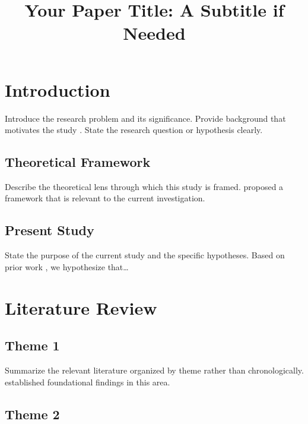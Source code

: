 \documentclass[man]{apa7}
\title{Your Paper Title: A Subtitle if Needed}
\begin{document}
\maketitle

\section{Introduction}

Introduce the research problem and its significance. Provide
background that motivates the study \parencite{smith2023}. State
the research question or hypothesis clearly.

\subsection{Theoretical Framework}

Describe the theoretical lens through which this study is framed.
\textcite{jones2022} proposed a framework that is relevant to the
current investigation.

\subsection{Present Study}

State the purpose of the current study and the specific hypotheses.
Based on prior work \parencite{smith2023,jones2022}, we hypothesize
that\ldots

\section{Literature Review}

\subsection{Theme 1}

Summarize the relevant literature organized by theme rather than
chronologically. \textcite{author2020} established foundational
findings in this area.

\subsection{Theme 2}
\end{document}
